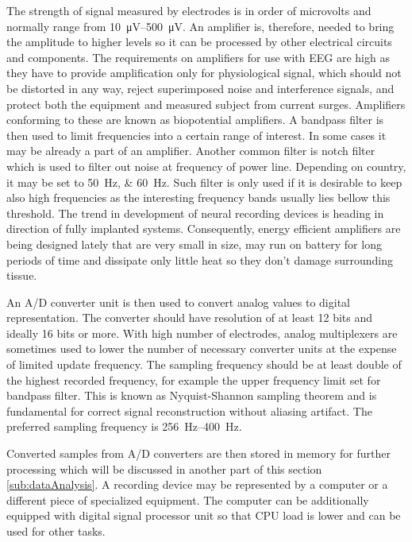 The strength of signal measured by electrodes is in order of microvolts and
normally range from \SIrange{10}{500}{\uV}. \cite{neuralAmp} An amplifier is,
therefore, needed to bring the amplitude to higher levels so it can be processed
by other electrical circuits and components. The requirements on amplifiers for
use with EEG are high as they have to provide amplification only for physiological
signal, which should not be distorted in any way, reject superimposed noise and
interference signals, and protect both the equipment and measured subject from
current surges. Amplifiers conforming to these are known as biopotential
amplifiers. \cite{biopotAmp}
A bandpass filter is then used to limit frequencies into a certain range of
interest. In some cases it may be already a part of an amplifier.
Another common filter is notch filter which is used to filter out noise
at frequency of power line. Depending on country, it may be set to
\SIlist[list-units = single, list-pair-separator = { or }]{50;60}{\Hz}.
\cite{deltaCompNREM} Such filter is only used if it is desirable to keep also
high frequencies as the interesting frequency bands usually lies bellow this
threshold.
The trend in development of neural recording devices is heading in direction of
fully implanted systems. Consequently, energy efficient amplifiers are being
designed lately that are very small in size, may run on battery for long
periods of time and dissipate only little heat so they don't damage surrounding
tissue. \cite{neuralAmp}

An A/D converter unit is then used to convert analog values to digital
representation. The converter should have resolution of at least 12 bits and
ideally 16 bits or more. With high number of electrodes, analog multiplexers are
sometimes used to lower the number of necessary converter units at the expense
of limited update frequency. The sampling frequency should be at least double of
the highest recorded frequency, for example the upper frequency limit set for
bandpass filter. This is known as Nyquist-Shannon sampling theorem and is
fundamental for correct signal reconstruction without aliasing artifact. The
preferred sampling frequency is \SIrange{256}{400}{\Hz}. \cite{guidDigEEG}

Converted samples from A/D converters are then stored in memory for further
processing which will be discussed in another part of this section
\ref{sub:dataAnalysis}. A recording device may be represented by a computer or a
different piece of specialized equipment. The computer can be additionally
equipped with digital signal processor unit so that CPU load is lower and can be
used for other tasks.

